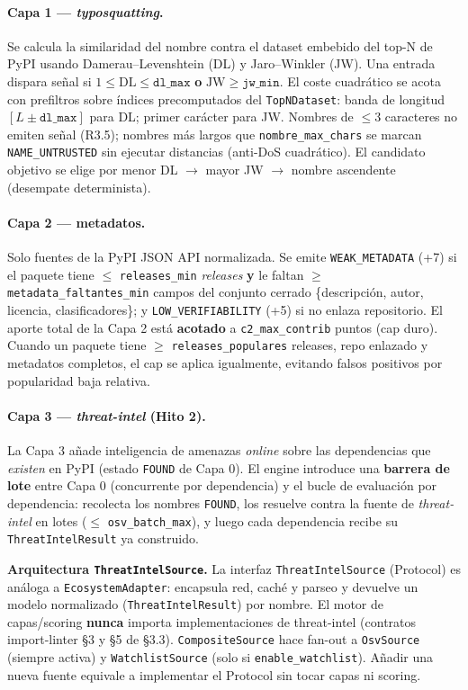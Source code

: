 \documentclass[11pt,a4paper]{article}
\begin{document}
\paragraph{Capa 1 --- \emph{typosquatting}.} Se calcula la similaridad del nombre contra
el dataset embebido del top-N de PyPI usando Damerau--Levenshtein (DL) y
Jaro--Winkler (JW). Una entrada dispara señal si $1 \le \mathrm{DL} \le
\mathtt{dl\_max}$ \textbf{o} $\mathrm{JW} \ge \mathtt{jw\_min}$. El coste cuadrático se
acota con prefiltros sobre índices precomputados del \texttt{TopNDataset}: banda de
longitud $[L \pm \mathtt{dl\_max}]$ para DL; primer carácter para JW. Nombres de
$\le 3$ caracteres no emiten señal (R3.5); nombres más largos que
\texttt{nombre_max_chars} se marcan \texttt{NAME\_UNTRUSTED} sin ejecutar
distancias (anti-DoS cuadrático). El candidato objetivo se elige por menor DL $\to$
mayor JW $\to$ nombre ascendente (desempate determinista).

\paragraph{Capa 2 --- metadatos.} Solo fuentes de la PyPI JSON API normalizada. Se emite
\texttt{WEAK\_METADATA} (+7) si el paquete tiene $\le$ \texttt{releases\_min}
\emph{releases} \textbf{y} le faltan $\ge$ \texttt{metadata\_faltantes\_min} campos
del conjunto cerrado \{descripción, autor, licencia, clasificadores\}; y
\texttt{LOW\_VERIFIABILITY} (+5) si no enlaza repositorio. El aporte total de la
Capa 2 está \textbf{acotado} a \texttt{c2\_max\_contrib} puntos (cap duro). Cuando
un paquete tiene $\ge$ \texttt{releases\_populares} releases, repo enlazado y
metadatos completos, el cap se aplica igualmente, evitando falsos positivos por
popularidad baja relativa.

\paragraph{Capa 3 --- \emph{threat-intel} (Hito 2).}
La Capa 3 añade inteligencia de amenazas \emph{online} sobre las dependencias que
\emph{existen} en PyPI (estado \texttt{FOUND} de Capa 0). El engine introduce una
\textbf{barrera de lote} entre Capa 0 (concurrente por dependencia) y el bucle de
evaluación por dependencia: recolecta los nombres \texttt{FOUND}, los resuelve contra
la fuente de \emph{threat-intel} en lotes ($\le$ \texttt{osv\_batch\_max}), y luego
cada dependencia recibe su \texttt{ThreatIntelResult} ya construido.

\medskip
\noindent\textbf{Arquitectura \texttt{ThreatIntelSource}.} La interfaz \texttt{ThreatIntelSource}
(Protocol) es análoga a \texttt{EcosystemAdapter}: encapsula red, caché y parseo y
devuelve un modelo normalizado (\texttt{ThreatIntelResult}) por nombre. El motor de
capas/scoring \textbf{nunca} importa implementaciones de threat-intel (contratos
import-linter \S3 y \S5 de §3.3). \texttt{CompositeSource} hace fan-out a
\texttt{OsvSource} (siempre activa) y \texttt{WatchlistSource} (solo si
\texttt{enable\_watchlist}). Añadir una nueva fuente equivale a implementar el
Protocol sin tocar capas ni scoring.
\end{document}
